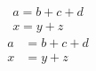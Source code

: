 \documentclass{article}
\begin{document}
\begin{gather}
a = b+c+d \\
x = y+z
\end{gather}
\begin{align}
a &= b+c+d \\
x &= y+z
\end{align}
\end{document}
